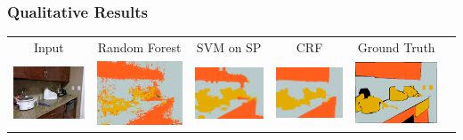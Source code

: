 \documentclass[final,ignorenonframetext,compress]{beamer}
\begin{document}
    \begin{frame}
        \frametitle{Qualitative Results}
        \begin{tabularx}{\linewidth}{@{\extracolsep{\fill}}cccccc}
    \footnotesize Input&
    \footnotesize Random Forest&
    \footnotesize SVM on SP&
    \footnotesize CRF&
    \footnotesize Ground Truth\\

    \includegraphics[width=.17\textwidth]{images/00845_image.png}&%
    \includegraphics[width=.17\linewidth]{images/00845_pixel.png}&%
    \includegraphics[width=.17\linewidth]{images/00845_svm.png}&%
    \includegraphics[width=.17\linewidth]{images/00845_ssvm.png}&%
    \includegraphics[width=.17\linewidth]{images/00845_gt.png}\\


\end{tabularx}
\end{frame}
\end{document}
